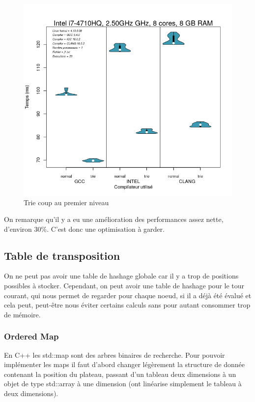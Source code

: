 \documentclass[
 aip,
 jmp,
 amsmath,amssymb,
 reprint
]{revtex4-1}
\begin{document}
\begin{figure}[H]
  \includegraphics[width=\linewidth, keepaspectratio=true]{trie.png}
  \caption{Trie coup au premier niveau\label{Fig:trie_coup}}
\end{figure}

On remarque qu'il y a eu une amélioration des performances assez nette, d'environ 30\%. C'est donc une optimisation à garder.

\subsection{Table de transposition}
On ne peut pas avoir une table de hashage globale car il y a trop de positions possibles à stocker. Cependant, on peut avoir une table de hashage pour le tour courant, qui nous permet de regarder pour chaque noeud, si il a déjà été évalué et cela peut, peut-être nous éviter certains calculs sans pour autant consommer trop de mémoire.

\subsubsection{Ordered Map}
En C++ les std::map sont des arbres binaires de recherche. Pour pouvoir implémenter les maps il faut d'abord changer légèrement la structure de donnée contenant la position du plateau, passant d'un tableau deux dimensions à un objet de type std::array à une dimension (ont linéarise simplement le tableau à deux dimensions).
\end{document}
